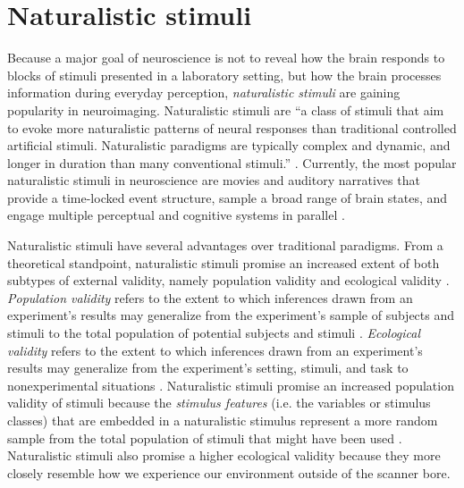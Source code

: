 \section{Naturalistic stimuli}
Because a major goal of neuroscience is not to reveal how the brain responds to
blocks of stimuli presented in a laboratory setting, but how the brain processes
information during everyday perception, \textit{naturalistic stimuli} are
gaining popularity in neuroimaging.
Naturalistic stimuli are ``a class of stimuli that aim to evoke more
naturalistic patterns of neural responses than traditional controlled artificial
stimuli. Naturalistic paradigms are typically complex and dynamic, and longer in
duration than many conventional stimuli.'' \citep[][p. 2]{vanderwal2019movies}.
Currently, the most popular naturalistic stimuli in neuroscience are movies and
auditory narratives \citep[cf.][for an introduction]{sonkusare2019naturalistic}
that provide a time-locked event structure, sample a broad range of brain
states, and engage multiple perceptual and cognitive systems in parallel
\citep{haxby2020naturalistic}.

%
Naturalistic stimuli have several advantages over traditional paradigms.
From a theoretical standpoint, naturalistic stimuli promise an increased extent
of both subtypes of external validity, namely population validity and ecological
validity \citep{bracht1968external}.
%
\textit{Population validity} refers to the extent to which inferences drawn from
an experiment's results may generalize from the experiment's sample of subjects
and stimuli to the total population of potential subjects and stimuli
\citep{bracht1968external, westfall2016fixing}.
%
\textit{Ecological validity} refers to the extent to which inferences drawn from
an experiment's results may generalize from the experiment's setting, stimuli,
and task to nonexperimental situations \citep{bracht1968external,
orne1962social, schmuckler2001ecological}.
Naturalistic stimuli promise an increased population validity of stimuli because
the \textit{stimulus features} (i.e. the variables or stimulus classes) that
are embedded in a naturalistic stimulus represent a more random sample from the
total population of stimuli that might have been used
\citep{westfall2016fixing}.
Naturalistic stimuli also promise a higher ecological validity
\citep{hasson2012future} because they more closely resemble how we experience
our environment outside of the scanner bore.

